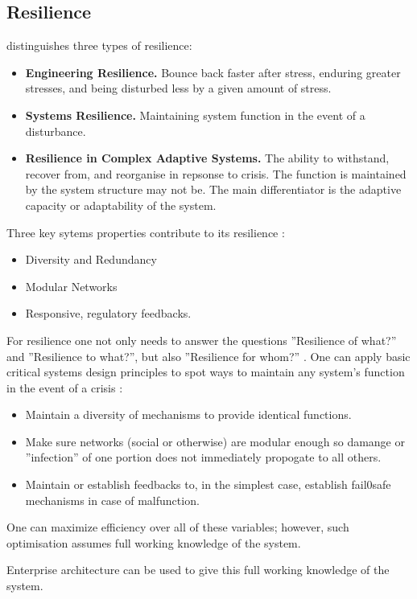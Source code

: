 \subsection{Resilience}
\textcite[p. 5-7]{MartinBreen2011} distinguishes three types of resilience:
\begin{itemize}
	\item{\textbf{Engineering Resilience.} Bounce back faster after stress, enduring greater stresses, and being disturbed less by a given amount of stress.}
	\item{\textbf{Systems Resilience.} Maintaining system function in the event of a disturbance.}
	\item{\textbf{Resilience in Complex Adaptive Systems.} The ability to withstand, recover from, and reorganise in repsonse to crisis. The function is maintained by the system structure may not be. The main differentiator is the adaptive capacity or adaptability of the system.}
\end{itemize}
Three key sytems properties contribute to its resilience \parencite[p. 9]{MartinBreen2011}:
\begin{itemize}
	\item{Diversity and Redundancy}
	\item{Modular Networks}
	\item{Responsive, regulatory feedbacks.}
\end{itemize}
For resilience one not only needs to answer the questions ''Resilience of what?'' and ''Resilience to what?'', but also ''Resilience for whom?'' \parencite[p. 21]{Lebel2006}. One can apply basic critical systems design principles to spot ways to maintain any system's function in the event of a crisis \parencite[p. 10]{MartinBreen2011}:
\begin{itemize}
	\item{Maintain a diversity of mechanisms to provide identical functions.}
	\item{Make sure networks (social or otherwise) are modular enough so damange or ''infection'' of one portion does not immediately propogate to all others.}
	\item{Maintain or establish feedbacks to, in the simplest case, establish fail0safe mechanisms in case of malfunction.}
\end{itemize}
One can maximize efficiency over all of these variables; however, such optimisation assumes full working knowledge of the system.
\begin{remark}
Enterprise architecture can be used to give this full working knowledge of the system.
\end{remark}

